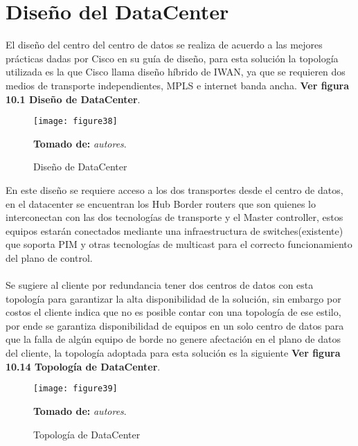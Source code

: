 \section{Diseño del DataCenter}
\label{sec:Diseño del DataCenter}

El diseño del centro del centro de datos se realiza de acuerdo a las mejores prácticas dadas por Cisco en su guía de diseño, para esta solución la topología utilizada es la que Cisco llama diseño híbrido de IWAN, ya que se requieren dos medios de transporte independientes, MPLS e internet banda ancha. \textbf{Ver figura 10.1 Diseño de DataCenter}.
\begin{figure}[htbp]
  \centering
    {\texttt{[image: figure38]}}%
  \caption{\footnotesize{Diseño de DataCenter}}
   \footnotesize{\textbf{Tomado de:} \textit{autores}.}
  \label{fig:fig2subfig}
\end{figure}

En este diseño se requiere acceso a los dos transportes desde el centro de datos, en el datacenter se encuentran los Hub Border routers que son quienes lo interconectan con las dos tecnologías de transporte y el Master controller, estos equipos estarán conectados mediante una infraestructura de switches(existente) que soporta PIM y otras tecnologías de multicast para el correcto funcionamiento del plano de control.
\\
\\
Se sugiere al cliente por redundancia tener dos centros de datos con esta topología para garantizar la alta disponibilidad de la solución, sin embargo por costos el cliente indica que no es posible contar con una topología de ese estilo, por ende se garantiza disponibilidad de equipos en un solo centro de datos para que la falla de algún equipo de borde no genere afectación en el plano de datos del cliente, la topología adoptada para esta solución es la siguiente \textbf{Ver figura 10.14 Topología de DataCenter}.

\begin{figure}[htbp]
  \centering
    {\texttt{[image: figure39]}}%
  \caption{\footnotesize{Topología de DataCenter}}
   \footnotesize{\textbf{Tomado de:} \textit{autores}.}
  \label{fig:fig2subfig}
\end{figure}

